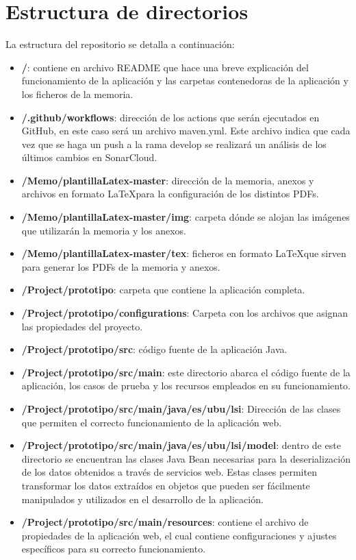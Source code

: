 \section{Estructura de directorios}
La estructura del repositorio se detalla a continuación:
\begin{itemize}
	\item \textbf{/}: contiene en archivo README que hace una breve explicación del funcionamiento de la aplicación y las carpetas contenedoras de la aplicación y los ficheros de la memoria.
	\item \textbf{/.github/workflows}: dirección de los actions que serán ejecutados en GitHub, en este caso será un archivo maven.yml. Este archivo indica que cada vez que se haga un push a la rama develop se realizará un análisis de los últimos cambios en SonarCloud.
	\item \textbf{/Memo/plantillaLatex-master}: dirección de la memoria, anexos y archivos en formato \LaTeX para la configuración de los distintos PDFs.
	\item \textbf{/Memo/plantillaLatex-master/img}: carpeta dónde se alojan las imágenes que utilizarán la memoria y los anexos.
	\item \textbf{/Memo/plantillaLatex-master/tex}: ficheros en formato \LaTeX que sirven para generar los PDFs de la memoria y anexos.
	\item \textbf{/Project/prototipo}: carpeta que contiene la aplicación completa.
	\item \textbf{/Project/prototipo/configurations}: Carpeta con los archivos que asignan las propiedades del proyecto.
	\item \textbf{/Project/prototipo/src}: código fuente de la aplicación Java.
	\item \textbf{/Project/prototipo/src/main}: este directorio abarca el código fuente de la aplicación, los casos de prueba y los recursos empleados en su funcionamiento. 
	\item \textbf{/Project/prototipo/src/main/java/es/ubu/lsi}: Dirección de las clases que permiten el correcto funcionamiento de la aplicación web.
	\item \textbf{/Project/prototipo/src/main/java/es/ubu/lsi/model}: dentro de este directorio se encuentran las clases Java Bean necesarias para la deserialización de los datos obtenidos a través de servicios web. Estas clases permiten transformar los datos extraídos en objetos que pueden ser fácilmente manipulados y utilizados en el desarrollo de la aplicación.
	\item \textbf{/Project/prototipo/src/main/resources}: contiene el archivo de propiedades de la aplicación web, el cual contiene configuraciones y ajustes específicos para su correcto funcionamiento.

\end{itemize}
